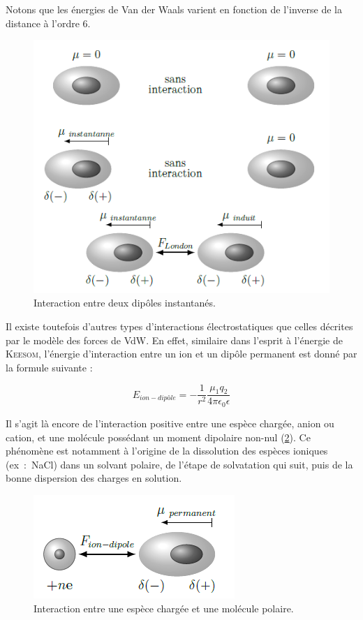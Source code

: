 {{Notons que les énergies de Van der Waals varient en fonction de l'inverse de la distance à l'ordre 6.

\begin{figure}[h]
\centering
\includegraphics[scale=0.95]{image/London}
\caption{Interaction entre deux dipôles instantanés.}
\label{figLondon}
\end{figure}


Il existe toutefois d'autres types d'interactions électrostatiques que celles décrites par le modèle des forces de VdW. En effet, similaire dans l'esprit à l'énergie de \textsc{Keesom}, l'énergie d'interaction entre un ion et un dipôle permanent est donné par la formule suivante :

\begin{equation}
E_{ion-dipôle} = - \frac{1}{r^{2}} \frac{\mu_{1}q_{2}}{4\pi \epsilon_{0} \epsilon}
\end{equation} 

Il s'agit là encore de l'interaction positive entre une espèce chargée, anion ou cation, et une molécule possédant un moment dipolaire non-nul (\ref{figiondipole}). Ce phénomène est notamment à l'origine de la dissolution des espèces ioniques (ex~:~NaCl) dans un solvant polaire, de l'étape de solvatation qui suit, puis de la bonne dispersion des charges en solution.

\begin{figure}[h]
\centering
\includegraphics[scale=0.7]{image/Ion-dipole}
\caption{Interaction entre une espèce chargée et une molécule polaire.}
\label{figiondipole}
\end{figure}

}}
